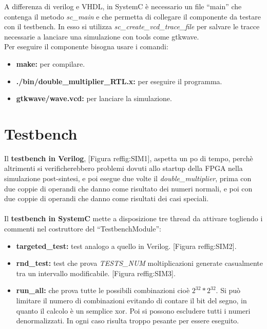 \documentclass[]{IEEEtran}
\begin{document}
A differenza di verilog e VHDL, in SystemC è necessario un file ``main'' che contenga il metodo \textit{sc\_main} e che permetta di collegare il componente da testare con il testbench. In esso si utilizza \textit{sc\_create\_vcd\_trace\_file} per salvare le tracce necessarie a lanciare una simulazione con tools come gtkwave.
\\Per eseguire il componente bisogna usare i comandi:
\begin{itemize}
    \item \textbf{make: } per compilare.
    \item \textbf{./bin/double\_multiplier\_RTL.x:} per eseguire il programma.
    \item \textbf{gtkwave/wave.vcd:} per lanciare la simulazione.
\end{itemize}



\section{Testbench}
Il \textbf{testbench in Verilog}, [Figura ref{fig:SIM1}], aspetta un po di tempo, perchè altrimenti si verificherebbero problemi dovuti allo startup della FPGA nella simulazione post-sintesi, e poi esegue due volte il \textit{double\_multiplier}, prima con due coppie di operandi che danno come risultato dei numeri normali, e poi con due coppie di operandi che danno come risultati dei casi speciali. \\\\


Il \textbf{testbench in SystemC} mette a disposizione tre thread da attivare togliendo i commenti nel costruttore del ``TestbenchModule'':
\begin{itemize}
    \item \textbf{targeted\_test:} test analogo a quello in Verilog. [Figura ref{fig:SIM2}].
    \item \textbf{rnd\_test:} test che prova \textit{TESTS\_NUM} moltiplicazioni generate casualmente tra un intervallo modificabile. [Figura ref{fig:SIM3}].
    \item \textbf{run\_all:} che prova tutte le possibili combinazioni cioè \(2^{32} * 2^{32}\). Si può limitare il numero di combinazioni evitando di contare il bit del segno, in quanto il calcolo è un semplice xor. Poi si possono escludere tutti i numeri denormalizzati. In ogni caso risulta troppo pesante per essere eseguito.
\end{itemize}
\end{document}
